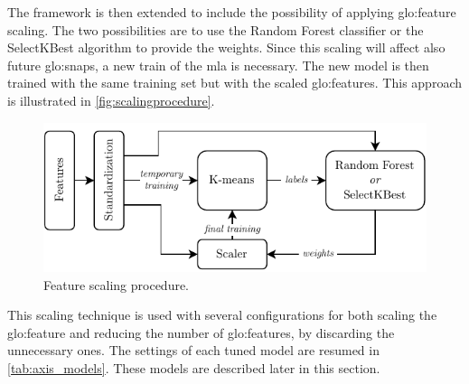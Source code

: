 The framework is then extended to include the possibility of applying \gls{glo:feature} scaling. The two possibilities are to use the Random Forest classifier or the SelectKBest algorithm to provide the weights. Since this scaling will affect also future \gls{glo:snap}s, a new train of the \gls{mla} is necessary. The new model is then trained with the same training set but with the scaled \gls{glo:feature}s. This approach is illustrated in \autoref{fig:scalingprocedure}.

\begin{figure}[h!]
    \centering
    \includegraphics{images/LinearMotor/Feat_scaling.pdf}
    \caption{Feature scaling procedure.}
    \label{fig:scalingprocedure}
\end{figure}

This scaling technique is used with several configurations for both scaling the \gls{glo:feature} and reducing the number of \gls{glo:feature}s, by discarding the unnecessary ones. The settings of each tuned model are resumed in \autoref{tab:axis_models}. These models are described later in this section.

